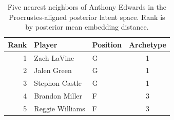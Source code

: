 \begin{table}[htbp]
  \centering\small
  \begin{tabular}{rllc}
    \toprule
    Rank & Player & Position & Archetype \\
    \midrule
    1 & Zach LaVine & G & 1 \\
    2 & Jalen Green & G & 1 \\
    3 & Stephon Castle & G & 1 \\
    4 & Brandon Miller & F & 3 \\
    5 & Reggie Williams & F & 3 \\
    \bottomrule
  \end{tabular}
  \caption{Five nearest neighbors of Anthony Edwards in the Procrustes-aligned posterior latent space. Rank is by posterior mean embedding distance.}
  \label{tab:Anthony_Edwards_neighbors}
\end{table}

